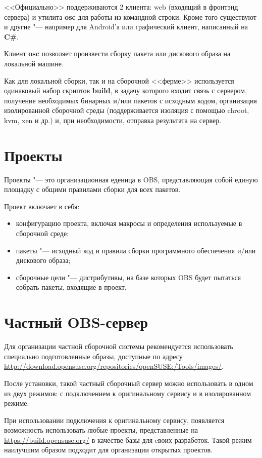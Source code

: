 \documentclass[10pt, a5paper]{article}
\begin{document}
<<Официально>> поддерживаются 2 клиента: web (входящий в фронтэнд сервера) и утилита \textbf{osc} для работы из командной строки. Кроме того существуют и другие "--- например для Android'а или графический клиент, написанный на \textbf{C\#}.

Клиент \textbf{osc} позволяет произвести сборку пакета или дискового образа на локальной машине.

Как для локальной сборки, так и на сборочной <<ферме>> используется одинаковый набор скриптов \textbf{build}, в задачу которого входит связь с сервером, получение необходимых бинарных и/или пакетов с исходным кодом, организация изолированной сборочной среды (поддерживается изоляция с помощью chroot, kvm, xen и др.) и, при необходимости, отправка результата на сервер.

\section*{Проекты}

Проекты "--- это организационная еденица в OBS, представляющая собой единую площадку с общими правилами сборки для всех пакетов.

Проект включает в себя:

\begin{itemize}
  \item конфигурацию проекта, включая макросы и определения используемые в сборочной среде;
  \item пакеты "--- исходный код и правила сборки программного обеспечения и/или дискового образа;
  \item сборочные цели "--- дистрибутивы, на базе которых OBS будет пытаться собрать пакеты,  входящие в проект.
\end{itemize}

\section*{Частный OBS-сервер}

Для организации частной сборочной системы рекомендуется \cite{Pynkin2} использовать специально подготовленные образы, доступные по адресу \url{http://download.opensuse.org/repositories/openSUSE:/Tools/images/}.

После установки, такой частный сборочный сервер можно использовать в одном из двух режимов: с подключением к оригинальному сервису и в изолированном режиме.

При использовании подключения к оригинальному сервису, появляется возможность использовать любые проекты, представленные на \url{https://build.opensuse.org/} в качестве базы для cвоих разработок. Такой режим наилучшим образом подходит для организации открытых проектов.
\end{document}
